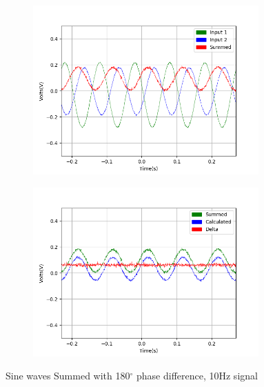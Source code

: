 \begin{figure}[h!]
\centering
\begin{subfigure}[t]{.475\textwidth}
  \centering
  \includegraphics[width=0.95\textwidth, height=0.20\textheight]{figures/Summing/scope_4raw.png}
 \label{fig:sum_4_og_data}
\end{subfigure}\hfill
\begin{subfigure}[t]{.475\textwidth}
  \centering
  \includegraphics[width=0.95\textwidth, height=0.20\textheight]{figures/Summing/scope_4.png}
\label{fig:sum_4_calc_data}
\end{subfigure}
\caption{Sine waves Summed with 180$^\circ$ phase difference, 10Hz signal}
\end{figure}

